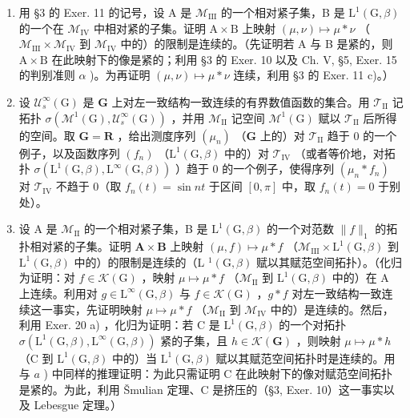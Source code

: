\begin{enumerate}
\def\labelenumi{\alph{enumi})}
\item
  用 §3 的 Exer. 11 的记号，设 A 是 \(\mathcal{M}_{\mathrm{III}}\) 的一个相对紧子集，B 是 \(\mathrm{L}^1 (\mathrm{G},\beta)\) 的一个在 \(\mathcal{M}_{\mathrm{IV}}\) 中相对紧的子集。证明 \(\mathrm{A}\times \mathrm{B}\) 上映射 \((\mu ,\nu)\mapsto \mu *\nu\) （\(\mathcal{M}_{\mathrm{III}}\times \mathcal{M}_{\mathrm{IV}}\) 到 \(\mathcal{M}_{\mathrm{IV}}\) 中的）的限制是连续的。（先证明若 A 与 B 是紧的，则 \(\mathrm{A}\times \mathrm{B}\) 在此映射下的像是紧的；利用 §3 的 Exer. 10 以及 Ch. V, §5, Exer. 15 的判别准则 \(\alpha\) )。为再证明 \((\mu ,\nu)\mapsto \mu *\nu\) 连续，利用 §3 的 Exer. 11 c)。）
\item
  设 \(\mathcal{U}_s^\infty (\mathrm{G})\) 是 \(\mathbf{G}\) 上对左一致结构一致连续的有界数值函数的集合。用 \(\mathcal{T}_{\mathrm{II}}\) 记拓扑 \(\sigma (\mathcal{M}^1 (\mathrm{G}),\mathcal{U}_s^\infty (\mathrm{G}))\) ，并用 \(\mathcal{M}_{\mathrm{II}}\) 记空间 \(\mathcal{M}^1 (\mathrm{G})\) 赋以 \(\mathcal{T}_{\mathrm{II}}\) 后所得的空间。取 \(\mathbf{G} = \mathbf{R}\) ，给出测度序列 \((\mu_n)\) （\(\mathbf{G}\) 上的）对 \(\mathcal{T}_{\mathrm{II}}\) 趋于 0 的一个例子，以及函数序列 \((f_n)\) （\(\mathrm{L}^1 (\mathrm{G},\beta)\) 中的）对 \(\mathcal{T}_{\mathrm{IV}}\) （或者等价地，对拓扑 \(\sigma (\mathrm{L}^1 (\mathrm{G},\beta),\mathrm{L}^\infty (\mathrm{G},\beta))\) ）趋于 0 的一个例子，使得序列 \((\mu_n*f_n)\) 对 \(\mathcal{T}_{\mathrm{IV}}\) 不趋于 0（取 \(f_{n}(t) = \sin nt\) 于区间 \([0,\pi ]\) 中，取 \(f_{n}(t) = 0\) 于别处）。
\item
  设 A 是 \(\mathcal{M}_{\mathrm{II}}\) 的一个相对紧子集，B 是 \(\mathrm{L}^1 (\mathrm{G},\beta)\) 的一个对范数 \(\| f\| _1\) 的拓扑相对紧的子集。证明 \(\mathbf{A}\times \mathbf{B}\) 上映射 \((\mu ,f)\mapsto \mu *\textit{f}\) （\(\mathcal{M}_{\mathrm{III}}\times \mathrm{L}^1 (\mathrm{G},\beta)\) 到 \(\mathrm{L}^1 (\mathrm{G},\beta)\) 中的）的限制是连续的（L \(^1 (\mathrm{G},\beta)\) 赋以其赋范空间拓扑）。（化归为证明：对 \(f\in \mathcal{K}(\mathrm{G})\) ，映射 \(\mu \mapsto \mu *\textit{f}\) （\(\mathcal{M}_{\mathrm{II}}\) 到 \(\mathrm{L}^1 (\mathrm{G},\beta)\) 中的）在 A 上连续。利用对 \(g\in \mathrm{L}^{\infty}(\mathrm{G},\beta)\) 与 \(f\in \mathcal{K}(\mathrm{G})\) ，\(g*\textit{f}\) 对左一致结构一致连续这一事实，先证明映射 \(\mu \mapsto \mu *\textit{f}\) （\(\mathcal{M}_{\mathrm{II}}\) 到 \(\mathcal{M}_{\mathrm{IV}}\) 中的）是连续的。然后，利用 Exer. 20 a) ，化归为证明：若 C 是 \(\mathrm{L}^1 (\mathrm{G},\beta)\) 的一个对拓扑 \(\sigma (\mathrm{L}^{1}(\mathrm{G},\beta),\mathrm{L}^{\infty}(\mathrm{G},\beta))\) 紧的子集，且 \(h\in \mathcal{K}(\mathbf{G})\) ，则映射 \(\mu \mapsto \mu *h\) （C 到 \(\mathrm{L}^1 (\mathrm{G},\beta)\) 中的）当 \(\mathrm{L}^1 (\mathrm{G},\beta)\) 赋以其赋范空间拓扑时是连续的。用与 \(a\) ) 中同样的推理证明：为此只需证明 C 在此映射下的像对赋范空间拓扑是紧的。为此，利用 Šmulian 定理、C 是挤压的（§3, Exer. 10）这一事实以及 Lebesgue 定理。）

\end{enumerate}
